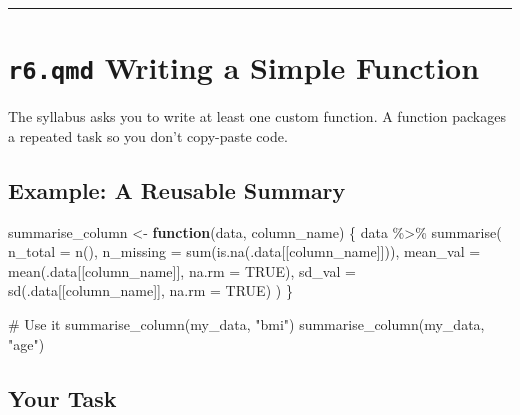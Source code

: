 \documentclass[
  letterpaper,
  DIV=11,
  numbers=noendperiod,
  oneside]{scrreprt}
\newenvironment{Shaded}{\begin{snugshade}}{\end{snugshade}}
\newcommand{\AttributeTok}[1]{\textcolor[rgb]{0.40,0.45,0.13}{#1}}
\newcommand{\CommentTok}[1]{\textcolor[rgb]{0.37,0.37,0.37}{#1}}
\newcommand{\ConstantTok}[1]{\textcolor[rgb]{0.56,0.35,0.01}{#1}}
\newcommand{\ControlFlowTok}[1]{\textcolor[rgb]{0.00,0.23,0.31}{\textbf{#1}}}
\newcommand{\FunctionTok}[1]{\textcolor[rgb]{0.28,0.35,0.67}{#1}}
\newcommand{\NormalTok}[1]{\textcolor[rgb]{0.00,0.23,0.31}{#1}}
\newcommand{\OtherTok}[1]{\textcolor[rgb]{0.00,0.23,0.31}{#1}}
\newcommand{\SpecialCharTok}[1]{\textcolor[rgb]{0.37,0.37,0.37}{#1}}
\newcommand{\StringTok}[1]{\textcolor[rgb]{0.13,0.47,0.30}{#1}}
\begin{document}
\begin{center}\rule{0.5\linewidth}{0.5pt}\end{center}

\section*{\texorpdfstring{\texttt{r6.qmd} Writing a Simple
Function}{r6.qmd Writing a Simple Function}}\label{r6.qmd-writing-a-simple-function}


The syllabus asks you to write at least one custom function. A function
packages a repeated task so you don't copy-paste code.

\subsection*{Example: A Reusable
Summary}\label{example-a-reusable-summary}

\begin{Shaded}
\begin{Highlighting}[numbers=left,,]
\NormalTok{summarise\_column }\OtherTok{\textless{}{-}} \ControlFlowTok{function}\NormalTok{(data, column\_name) \{}
\NormalTok{  data }\SpecialCharTok{\%\textgreater{}\%}
    \FunctionTok{summarise}\NormalTok{(}
      \AttributeTok{n\_total   =} \FunctionTok{n}\NormalTok{(),}
      \AttributeTok{n\_missing =} \FunctionTok{sum}\NormalTok{(}\FunctionTok{is.na}\NormalTok{(.data[[column\_name]])),}
      \AttributeTok{mean\_val  =} \FunctionTok{mean}\NormalTok{(.data[[column\_name]], }\AttributeTok{na.rm =} \ConstantTok{TRUE}\NormalTok{),}
      \AttributeTok{sd\_val    =} \FunctionTok{sd}\NormalTok{(.data[[column\_name]], }\AttributeTok{na.rm =} \ConstantTok{TRUE}\NormalTok{)}
\NormalTok{    )}
\NormalTok{\}}

\CommentTok{\# Use it}
\FunctionTok{summarise\_column}\NormalTok{(my\_data, }\StringTok{"bmi"}\NormalTok{)}
\FunctionTok{summarise\_column}\NormalTok{(my\_data, }\StringTok{"age"}\NormalTok{)}
\end{Highlighting}
\end{Shaded}

\subsection*{Your Task}\label{your-task}
\end{document}
